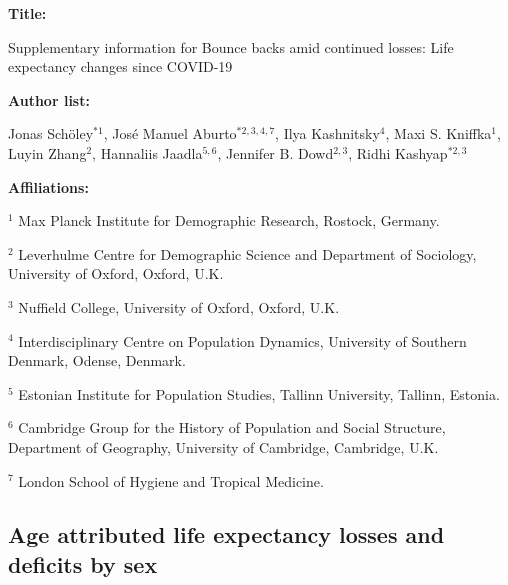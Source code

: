 \documentclass[12pt]{article}
\begin{document}
\begin{titlepage}


{\textbf{Title:}\par
Supplementary information for Bounce backs amid continued losses: Life expectancy changes since COVID-19
\par\medskip}

{\textbf{Author list:}\par
Jonas Schöley$^{*1}$,
José Manuel Aburto$^{*2,3,4,7}$,
Ilya Kashnitsky$^{4}$,
Maxi S. Kniffka$^1$,
Luyin Zhang$^2$,
Hannaliis Jaadla$^{5,6}$,
Jennifer B. Dowd$^{2,3}$,
Ridhi Kashyap$^{*2,3}$
\par\medskip}

{\textbf{Affiliations:}\par
$^1$ Max Planck Institute for Demographic Research, Rostock, Germany.\par
$^2$ Leverhulme Centre for Demographic Science and Department of Sociology, University of Oxford, Oxford, U.K.\par
$^3$ Nuffield College, University of Oxford, Oxford, U.K.\par
$^4$ Interdisciplinary Centre on Population Dynamics, University of Southern Denmark, Odense, Denmark.\par
$^5$ Estonian Institute for Population Studies, Tallinn University, Tallinn, Estonia.\par
$^6$ Cambridge Group for the History of Population and Social Structure, Department of Geography, University of Cambridge, Cambridge, U.K.\par
$^7$ London School of Hygiene and Tropical Medicine.\par
\par\medskip}

\end{titlepage}

\renewcommand\thefigure{S\arabic{figure}}
\setcounter{figure}{0}
\renewcommand\thetable{S\arabic{table}}
\setcounter{table}{0}


\subsection*{Age attributed life expectancy losses and deficits by sex}
\end{document}

